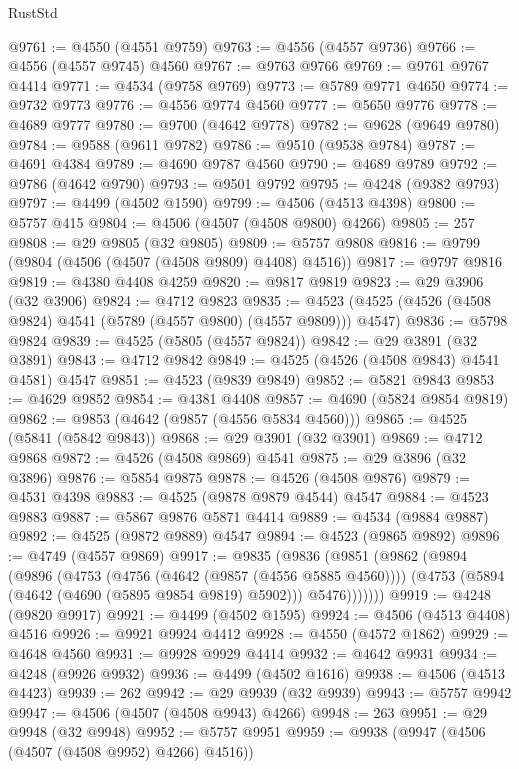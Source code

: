 \begin{lexlean}{RustStd}
\begin{coremodule}
@9761 := @4550 (@4551 @9759)
@9763 := @4556 (@4557 @9736)
@9766 := @4556 (@4557 @9745) @4560
@9767 := @9763 @9766
@9769 := @9761 @9767 @4414
@9771 := @4534 (@9758 @9769)
@9773 := @5789 @9771 @4650
@9774 := @9732 @9773
@9776 := @4556 @9774 @4560
@9777 := @5650 @9776
@9778 := @4689 @9777
@9780 := @9700 (@4642 @9778)
@9782 := @9628 (@9649 @9780)
@9784 := @9588 (@9611 @9782)
@9786 := @9510 (@9538 @9784)
@9787 := @4691 @4384
@9789 := @4690 @9787 @4560
@9790 := @4689 @9789
@9792 := @9786 (@4642 @9790)
@9793 := @9501 @9792
@9795 := @4248 (@9382 @9793)
@9797 := @4499 (@4502 @1590)
@9799 := @4506 (@4513 @4398)
@9800 := @5757 @415
@9804 := @4506 (@4507 (@4508 @9800) @4266)
@9805 := 257
@9808 := @29 @9805 (@32 @9805)
@9809 := @5757 @9808
@9816 := @9799 (@9804 (@4506 (@4507 (@4508 @9809) @4408) @4516))
@9817 := @9797 @9816
@9819 := @4380 @4408 @4259
@9820 := @9817 @9819
@9823 := @29 @3906 (@32 @3906)
@9824 := @4712 @9823
@9835 := @4523 (@4525 (@4526 (@4508 @9824) @4541 (@5789 (@4557 @9800) (@4557 @9809))) @4547)
@9836 := @5798 @9824
@9839 := @4525 (@5805 (@4557 @9824))
@9842 := @29 @3891 (@32 @3891)
@9843 := @4712 @9842
@9849 := @4525 (@4526 (@4508 @9843) @4541 @4581) @4547
@9851 := @4523 (@9839 @9849)
@9852 := @5821 @9843
@9853 := @4629 @9852
@9854 := @4381 @4408
@9857 := @4690 (@5824 @9854 @9819)
@9862 := @9853 (@4642 (@9857 (@4556 @5834 @4560)))
@9865 := @4525 (@5841 (@5842 @9843))
@9868 := @29 @3901 (@32 @3901)
@9869 := @4712 @9868
@9872 := @4526 (@4508 @9869) @4541
@9875 := @29 @3896 (@32 @3896)
@9876 := @5854 @9875
@9878 := @4526 (@4508 @9876)
@9879 := @4531 @4398
@9883 := @4525 (@9878 @9879 @4544) @4547
@9884 := @4523 @9883
@9887 := @5867 @9876 @5871 @4414
@9889 := @4534 (@9884 @9887)
@9892 := @4525 (@9872 @9889) @4547
@9894 := @4523 (@9865 @9892)
@9896 := @4749 (@4557 @9869)
@9917 := @9835
    (@9836
      (@9851
        (@9862
          (@9894
            (@9896
              (@4753
                (@4756 (@4642 (@9857 (@4556 @5885 @4560))))
                (@4753 (@5894 (@4642 (@4690 (@5895 @9854 @9819) @5902))) @5476)))))))
@9919 := @4248 (@9820 @9917)
@9921 := @4499 (@4502 @1595)
@9924 := @4506 (@4513 @4408) @4516
@9926 := @9921 @9924 @4412
@9928 := @4550 (@4572 @1862)
@9929 := @4648 @4560
@9931 := @9928 @9929 @4414
@9932 := @4642 @9931
@9934 := @4248 (@9926 @9932)
@9936 := @4499 (@4502 @1616)
@9938 := @4506 (@4513 @4423)
@9939 := 262
@9942 := @29 @9939 (@32 @9939)
@9943 := @5757 @9942
@9947 := @4506 (@4507 (@4508 @9943) @4266)
@9948 := 263
@9951 := @29 @9948 (@32 @9948)
@9952 := @5757 @9951
@9959 := @9938 (@9947 (@4506 (@4507 (@4508 @9952) @4266) @4516))

\end{coremodule}
\end{lexlean}
